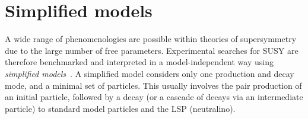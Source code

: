 \section{Simplified models}
\label{sec:theory-simplifiedmodels}
A wide range of phenomenologies are possible within theories of supersymmetry 
due to the large number of free parameters. Experimental searches for SUSY are 
therefore benchmarked and interpreted in a model-independent way using 
\textit{simplified models}~\cite{simpmodels1,simpmodels2}.
A simplified model considers only one production and decay mode, and a minimal 
set of particles. This usually involves the pair production of an initial 
particle, followed by a decay (or a cascade of decays via an intermediate 
particle) to standard model particles and the LSP (neutralino).



